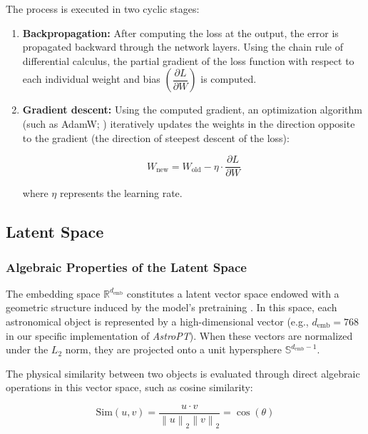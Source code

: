 The process is executed in two cyclic stages:
\begin{enumerate}
\item \textbf{Backpropagation:} After computing the loss at the output, the error is propagated backward through the network layers. Using the chain rule of differential calculus, the partial gradient of the loss function with respect to each individual weight and bias $\left(\dfrac{\partial L}{\partial W}\right)$ is computed.
\item \textbf{Gradient descent:} Using the computed gradient, an optimization algorithm (such as AdamW; \textcite{ar:loshchilov-2019}) iteratively updates the weights in the direction opposite to the gradient (the direction of steepest descent of the loss):

\begin{equation}
W_{\text{new}} = W_{\text{old}} - \eta \cdot \dfrac{\partial L}{\partial W}
\label{eq:gradient_descent}
\end{equation}

   where $\eta$ represents the learning rate.
\end{enumerate}

\subsection{Latent Space} \label{sec:tb:emb}

\subsubsection{Algebraic Properties of the Latent Space}

The embedding space $\mathbb{R}^{d_{\text{emb}}}$ constitutes a latent vector space endowed with a geometric structure induced by the model's pretraining \autocites{ar:astropt}{ar:astroclip}{ar:aion-1}. In this space, each astronomical object is represented by a high-dimensional vector (e.g., $d_{\text{emb}} = 768$ in our specific implementation of \textit{AstroPT}). When these vectors are normalized under the $L_2$ norm, they are projected onto a unit hypersphere $\mathbb{S}^{d_{\text{emb}}-1}$.

The physical similarity between two objects is evaluated through direct algebraic operations in this vector space, such as cosine similarity:

\begin{equation}
\text{Sim}\left(u, v\right) = \dfrac{u \cdot v}{\left\|u\right\|_2 \left\|v\right\|_2} = \cos\left(\theta\right)
\label{eq:cosine_similarity}
\end{equation}

